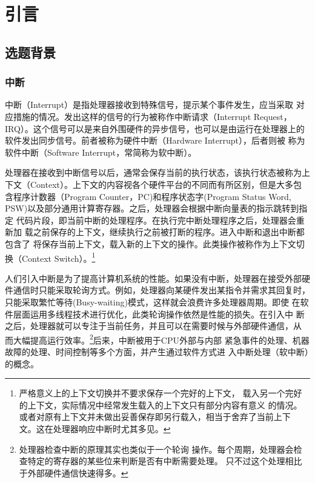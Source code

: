 
\chapter{引言}
\label{cha:intro}

\section{选题背景}
\label{sec:background}

\subsection{中断}
\label{subsec:intr}
中断（Interrupt）是指处理器接收到特殊信号，提示某个事件发生，应当采取
对应措施的情况。发出这样的信号的行为被称作中断请求（Interrupt Request，
IRQ）。这个信号可以是来自外围硬件的异步信号，也可以是由运行在处理器上的
软件发出同步信号。前者被称为硬件中断（Hardware Interrupt），后者则被
称为软件中断（Software Interrupt，常简称为软中断）。

处理器在接收到中断信号以后，通常会保存当前的执行状态，该执行状态被称为上
下文（Context）。上下文的内容视各个硬件平台的不同而有所区别，但是大多包
含程序计数器（Program Counter，PC)和程序状态字(Program Status Word, 
PSW)以及部分通用计算寄存器。之后，处理器会根据中断向量表的指示跳转到指定
代码片段，即当前中断的处理程序。在执行完中断处理程序之后，处理器会重新加
载之前保存的上下文，继续执行之前被打断的程序。进入中断和退出中断都包含了
将保存当前上下文，载入新的上下文的操作。此类操作被称作为上下文切换（Context 
Switch）。\footnote{严格意义上的上下文切换并不要求保存一个完好的上下文，
载入另一个完好的上下文，实际情况中经常发生载入的上下文只有部分内容有意义
的情况。或者对原有上下文并未做出妥善保存即另行载入，相当于舍弃了当前上下
文。这在处理器响应中断时尤其多见。}

人们引入中断是为了提高计算机系统的性能。如果没有中断，处理器在接受外部硬
件通信时只能采取轮询方式。例如，处理器向某硬件发出某指令并需求其回复时，
只能采取繁忙等待(Busy-waiting)模式，这样就会浪费许多处理器周期。即使
在软件层面运用多线程技术进行优化，此类轮询操作依然是性能的损失。在引入中
断之后，处理器就可以专注于当前任务，并且可以在需要时候与外部硬件通信，从
而大幅提高运行效率。\footnote{处理器检查中断的原理其实也类似于一个轮询
操作。每个周期，处理器会检查特定的寄存器的某些位来判断是否有中断需要处理。
只不过这个处理相比于外部硬件通信快速得多。}后来，中断被用于CPU外部与内部
紧急事件的处理、机器故障的处理、时间控制等多个方面，并产生通过软件方式进
入中断处理（软中断）的概念。

